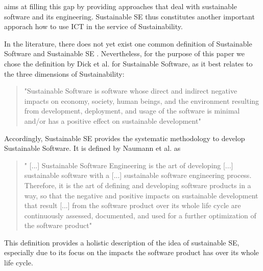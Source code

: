 \documentclass[oribibl]{llncs}
\begin{document}
aims at filling this gap by providing approaches that deal with sustainable software and its engineering. Sustainable SE thus constitutes another important apporach how to use ICT in the service of Sustainability. %

In the literature, there does not yet exist one common definition of Sustainable Software and Sustainable SE \cite{venters_software_2014}. Nevertheless, for the purpose of this paper we chose the definition by Dick et al. \cite{dick_model_2010} for Sustainable Software, as it best relates to the three dimensions of Sustainability: 
\begin{quote}
	"Sustainable Software is software whose direct and indirect negative impacts on economy, society, human beings, and the environment resulting from development, deployment, and usage of the software is minimal and/or has a positive effect on sustainable development" \cite[p.\,3]{dick_model_2010}
\end{quote}
Accordingly, Sustainable SE provides the systematic methodology to develop Sustainable Software. It is defined by Naumann et al. as
\begin{quote}
	" [...] Sustainable Software Engineering is the art of developing [...] sustainable software with a [...] sustainable software engineering process. Therefore, it is the art of defining and developing software products in a way, so that the negative and positive impacts on sustainable development that result [...] from the software product over its whole life cycle are continuously assessed, documented, and used for a further optimization of the software product" \cite[p.\,3]{naumann_greensoft_2011} %
\end{quote}
This definition provides a holistic description of the idea of sustainable SE, especially due to its focus on the impacts the software product has over its whole life cycle.\\ %
\end{document}
